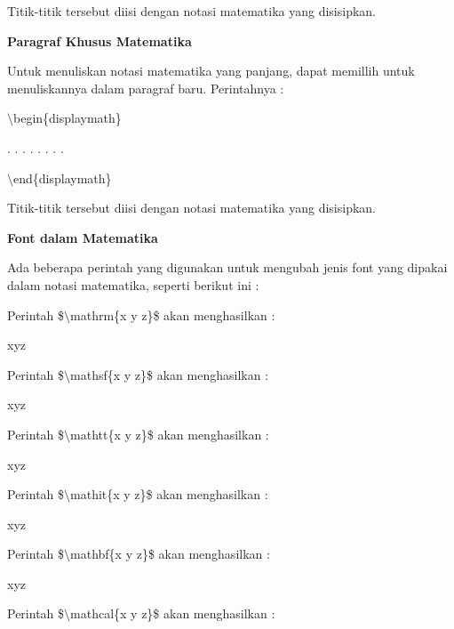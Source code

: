 Titik-titik tersebut diisi dengan notasi matematika yang disisipkan.\par \vspace{12pt}

\textbf{Paragraf Khusus Matematika}
\par \vspace{12pt}
Untuk menuliskan notasi matematika yang panjang, dapat memillih untuk menuliskannya dalam paragraf baru. Perintahnya :
\par \vspace{12pt}
$\setminus$begin\{displaymath\}
\par \vspace{12pt}
. . . . . . . .
\par \vspace{12pt}
$\setminus$end\{displaymath\}
\par \vspace{12pt}


Titik-titik tersebut diisi dengan notasi matematika yang disisipkan.
\par \vspace{12pt}
\textbf{Font dalam Matematika}
\par \vspace{12pt}
Ada beberapa perintah yang digunakan untuk mengubah jenis font yang dipakai dalam notasi matematika, seperti berikut ini :
\par \vspace{12pt}
Perintah \$$\setminus$mathrm\{x y z\}\$ 
akan menghasilkan :

xyz
\par \vspace{12pt}
Perintah \$$\setminus$mathsf\{x y z\}\$ 
akan menghasilkan :

xyz
\par \vspace{12pt}
Perintah \$$\setminus$mathtt\{x y z\}\$ 
akan menghasilkan :

xyz
\par \vspace{12pt}
Perintah \$$\setminus$mathit\{x y z\}\$ 
akan menghasilkan :

xyz\par \vspace{12pt}



Perintah \$$\setminus$mathbf\{x y z\}\$ 
akan menghasilkan :

xyz
\par \vspace{12pt}
Perintah \$$\setminus$mathcal\{x y z\}\$ 
akan menghasilkan :


